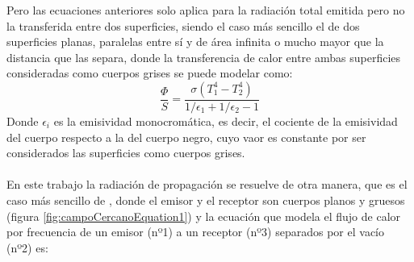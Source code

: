  Pero las ecuaciones anteriores solo aplica para la radiación total emitida pero no la transferida entre dos superficies, siendo el caso más sencillo el de dos superficies planas, paralelas entre sí y de área infinita o mucho mayor que la distancia que las separa, donde la transferencia de calor entre ambas superficies consideradas como cuerpos grises se puede modelar como:
\begin{equation}
\frac{\Phi}{S}=\frac{\sigma \left( T_1^4 -T_2^4 \right)}{1/\epsilon_1 +1/\epsilon_2 -1}
\label{eq:flujoCalorSuperficiesGrises}
\end{equation}
Donde $\epsilon_i$ es la emisividad monocromática, es decir, el cociente de la emisividad del cuerpo respecto a la del cuerpo negro, cuyo vaor es constante por ser considerados las superficies como cuerpos grises.\\\\
En este trabajo la radiación de propagación se resuelve de otra manera, que es el caso más sencillo de \cite{nfTPV_equations}, donde el emisor y el receptor son cuerpos planos y gruesos (figura \ref{fig:campoCercanoEquation1}) y la ecuación que modela el flujo de calor por frecuencia de un emisor (nº1) a un receptor (nº3) separados por el vacío (nº2) es:

